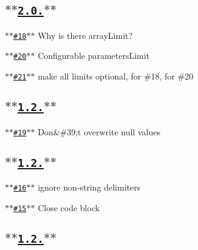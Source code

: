 \subsection*{\href{https://github.com/hapijs/qs/issues?milestone=7&state=closed}{\tt $\ast$$\ast$2.0.$\ast$$\ast$}}


\begin{DoxyItemize}
\item \href{https://github.com/hapijs/qs/issues/18}{\tt $\ast$$\ast$\#18$\ast$$\ast$} Why is there array\+Limit?
\item \href{https://github.com/hapijs/qs/issues/20}{\tt $\ast$$\ast$\#20$\ast$$\ast$} Configurable parameters\+Limit
\item \href{https://github.com/hapijs/qs/issues/21}{\tt $\ast$$\ast$\#21$\ast$$\ast$} make all limits optional, for \#18, for \#20
\end{DoxyItemize}

\subsection*{\href{https://github.com/hapijs/qs/issues?milestone=6&state=closed}{\tt $\ast$$\ast$1.2.$\ast$$\ast$}}


\begin{DoxyItemize}
\item \href{https://github.com/hapijs/qs/issues/19}{\tt $\ast$$\ast$\#19$\ast$$\ast$} Don\&\#39;t overwrite null values
\end{DoxyItemize}

\subsection*{\href{https://github.com/hapijs/qs/issues?milestone=5&state=closed}{\tt $\ast$$\ast$1.2.$\ast$$\ast$}}


\begin{DoxyItemize}
\item \href{https://github.com/hapijs/qs/issues/16}{\tt $\ast$$\ast$\#16$\ast$$\ast$} ignore non-\/string delimiters
\item \href{https://github.com/hapijs/qs/issues/15}{\tt $\ast$$\ast$\#15$\ast$$\ast$} Close code block
\end{DoxyItemize}

\subsection*{\href{https://github.com/hapijs/qs/issues?milestone=4&state=closed}{\tt $\ast$$\ast$1.2.$\ast$$\ast$}}



